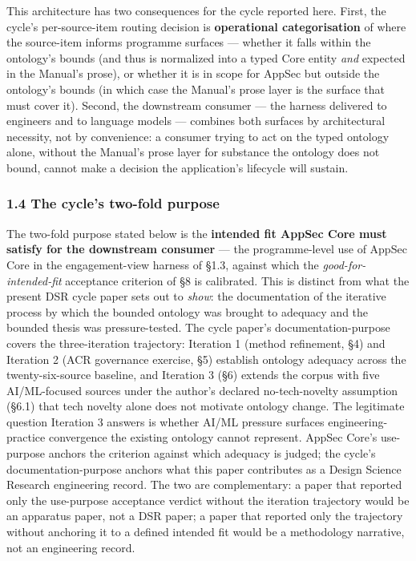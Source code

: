 \documentclass[
]{article}
\begin{document}
This architecture has two consequences for the cycle reported here.
First, the cycle's per-source-item routing decision is
\textbf{operational categorisation} of where the source-item informs
programme surfaces --- whether it falls within the ontology's bounds
(and thus is normalized into a typed Core entity \emph{and} expected in
the Manual's prose), or whether it is in scope for AppSec but outside
the ontology's bounds (in which case the Manual's prose layer is the
surface that must cover it). Second, the downstream consumer --- the
harness delivered to engineers and to language models --- combines both
surfaces by architectural necessity, not by convenience: a consumer
trying to act on the typed ontology alone, without the Manual's prose
layer for substance the ontology does not bound, cannot make a decision
the application's lifecycle will sustain.

\subsubsection{1.4 The cycle's two-fold
purpose}\label{the-cycles-two-fold-purpose}

The two-fold purpose stated below is the \textbf{intended fit AppSec
Core must satisfy for the downstream consumer} --- the programme-level
use of AppSec Core in the engagement-view harness of §1.3, against which
the \emph{good-for-intended-fit} acceptance criterion of §8 is
calibrated. This is distinct from what the present DSR cycle paper sets
out to \emph{show}: the documentation of the iterative process by which
the bounded ontology was brought to adequacy and the bounded thesis was
pressure-tested. The cycle paper's documentation-purpose covers the
three-iteration trajectory: Iteration 1 (method refinement, §4) and
Iteration 2 (ACR governance exercise, §5) establish ontology adequacy
across the twenty-six-source baseline, and Iteration 3 (§6) extends the
corpus with five AI/ML-focused sources under the author's declared
no-tech-novelty assumption (§6.1) that tech novelty alone does not
motivate ontology change. The legitimate question Iteration 3 answers is
whether AI/ML pressure surfaces engineering-practice convergence the
existing ontology cannot represent. AppSec Core's use-purpose anchors
the criterion against which adequacy is judged; the cycle's
documentation-purpose anchors what this paper contributes as a Design
Science Research engineering record. The two are complementary: a paper
that reported only the use-purpose acceptance verdict without the
iteration trajectory would be an apparatus paper, not a DSR paper; a
paper that reported only the trajectory without anchoring it to a
defined intended fit would be a methodology narrative, not an
engineering record.
\end{document}
